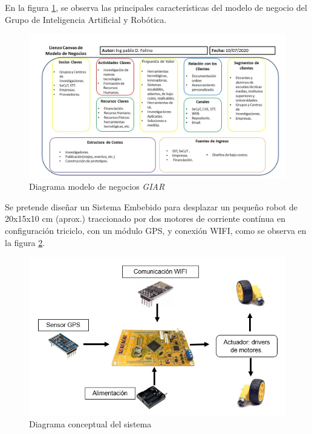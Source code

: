 \documentclass[11pt]{charter}
\begin{document}
En la figura \ref{fig:ModNegGIAR}, se observa las principales características del modelo de negocio del Grupo de Inteligencia Artificial y Robótica.

\begin{figure}[htpb]
\centering 
\includegraphics[width=\textwidth]{./Figuras/GIAR.jpg}
\caption{Diagrama modelo de negocios \textit{GIAR}}
\label{fig:ModNegGIAR}
\end{figure}


Se pretende diseñar un Sistema Embebido para desplazar un pequeño robot de 20x15x10 cm (aprox.) traccionado por dos motores de corriente contínua en configuración triciclo, con  un módulo GPS, y conexión WIFI, como se observa en la figura \ref{fig:diagConceptual}. 


\vspace{25px}

\begin{figure}[htpb]
\centering 
\includegraphics[width=.8\textwidth]{./Figuras/Robot.png}
\caption{Diagrama conceptual del sistema}
\label{fig:diagConceptual}
\end{figure}
\end{document}
